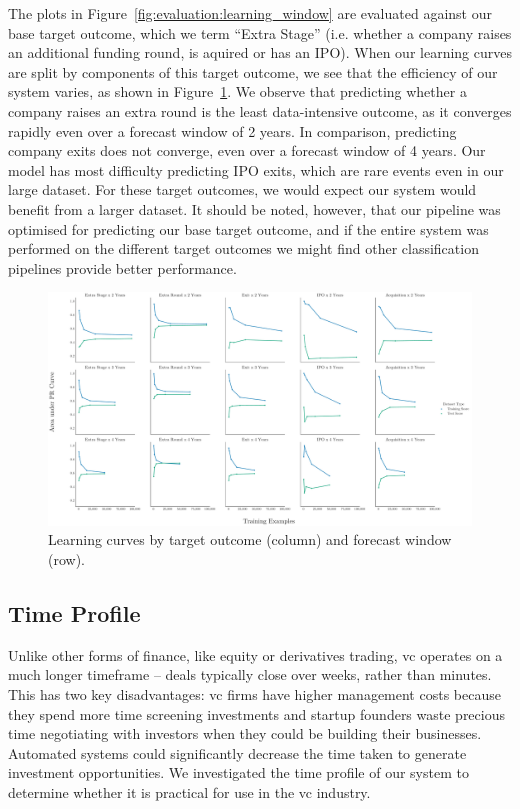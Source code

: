 \documentclass[../thesis/thesis.tex]{subfiles}
\begin{document}
The plots in Figure~\ref{fig:evaluation:learning_window} are evaluated against our base target outcome, which we term ``Extra Stage'' (i.e. whether a company raises an additional funding round, is aquired or has an IPO). When our learning curves are split by components of this target outcome, we see that the efficiency of our system varies, as shown in Figure~\ref{fig:evaluation:learning_outcome_window}. We observe that predicting whether a company raises an extra round is the least data-intensive outcome, as it converges rapidly even over a forecast window of 2 years. In comparison, predicting company exits does not converge, even over a forecast window of 4 years. Our model has most difficulty predicting IPO exits, which are rare events even in our large dataset. For these target outcomes, we would expect our system would benefit from a larger dataset. It should be noted, however, that our pipeline was optimised for predicting our base target outcome, and if the entire system was performed on the different target outcomes we might find other classification pipelines provide better performance.

\begin{figure}[!htb]
    \centering
    \includegraphics[width=\textwidth]{../figures/evaluation/learning_curves_outcome}
    \caption[Learning curves by target outcome]{Learning curves by target outcome (column) and forecast window (row).}
    \label{fig:evaluation:learning_outcome_window}
\end{figure}

\subsection{Time Profile}

Unlike other forms of finance, like equity or derivatives trading, \gls{vc} operates on a much longer timeframe -- deals typically close over weeks, rather than minutes. This has two key disadvantages: \gls{vc} firms have higher management costs because they spend more time screening investments and startup founders waste precious time negotiating with investors when they could be building their businesses. Automated systems could significantly decrease the time taken to generate investment opportunities. We investigated the time profile of our system to determine whether it is practical for use in the \gls{vc} industry.
\end{document}
